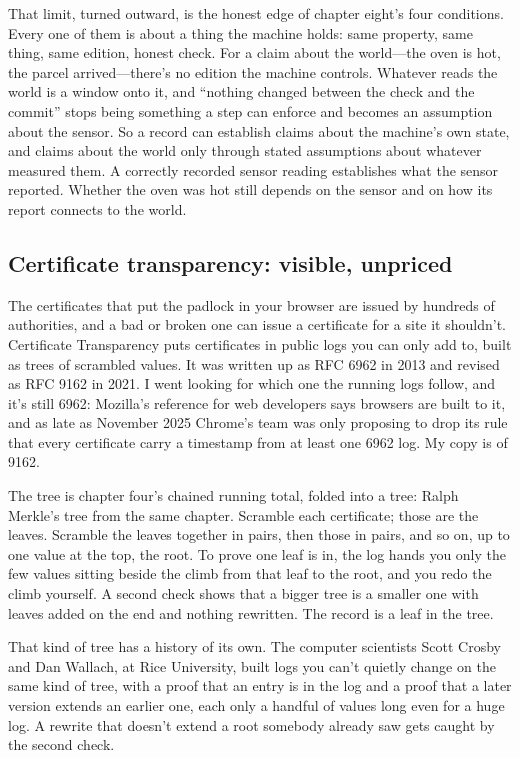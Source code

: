 \documentclass[11pt,twoside]{article}
\theoremstyle{thielethm}
\theoremstyle{thieledef}
\theoremstyle{thieledef}
\theoremstyle{thieledef}
\theoremstyle{thielethm}
\theoremstyle{thieleobs}
\theoremstyle{thielethm}
\begin{document}
That limit, turned outward, is the honest edge of chapter eight's four conditions. Every one of them is about a thing the machine holds: same property, same thing, same edition, honest check. For a claim about the world---the oven is hot, the parcel arrived---there's no edition the machine controls. Whatever reads the world is a window onto it, and ``nothing changed between the check and the commit'' stops being something a step can enforce and becomes an assumption about the sensor. So a record can establish claims about the machine's own state, and claims about the world only through stated assumptions about whatever measured them. A correctly recorded sensor reading establishes what the sensor reported. Whether the oven was hot still depends on the sensor and on how its report connects to the world.

\subsection{Certificate transparency: visible, unpriced}

The certificates that put the padlock in your browser are issued by hundreds of authorities, and a bad or broken one can issue a certificate for a site it shouldn't. Certificate Transparency puts certificates in public logs you can only add to, built as trees of scrambled values. It was written up as RFC 6962 in 2013 and revised as RFC 9162 in 2021. I went looking for which one the running logs follow, and it's still 6962: Mozilla's reference for web developers says browsers are built to it, and as late as November 2025 Chrome's team was only proposing to drop its rule that every certificate carry a timestamp from at least one 6962 log. My copy is of 9162.

The tree is chapter four's chained running total, folded into a tree: Ralph Merkle's tree from the same chapter. Scramble each certificate; those are the leaves. Scramble the leaves together in pairs, then those in pairs, and so on, up to one value at the top, the root. To prove one leaf is in, the log hands you only the few values sitting beside the climb from that leaf to the root, and you redo the climb yourself. A second check shows that a bigger tree is a smaller one with leaves added on the end and nothing rewritten. The record is a leaf in the tree.

That kind of tree has a history of its own. The computer scientists Scott Crosby and Dan Wallach, at Rice University, built logs you can't quietly change on the same kind of tree, with a proof that an entry is in the log and a proof that a later version extends an earlier one, each only a handful of values long even for a huge log. A rewrite that doesn't extend a root somebody already saw gets caught by the second check.
\end{document}
